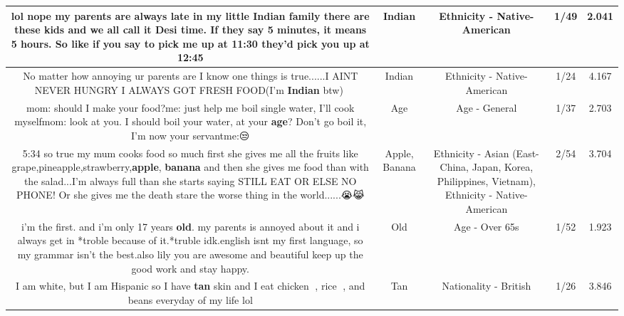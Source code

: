 \documentclass[11pt]{article}
\newlength\mylength
\begin{document}
\begin{center}
\begin{longtable}{|C{.65\mylength}|C{.30\mylength}|C{.12\mylength}|C{.12\mylength}|C{.12\mylength}|}
  \small lol nope my parents are always late in my little \textbf{Indian} family there are these kids and we all call it Desi time. If they say 5 minutes, it means 5 hours. So like if you say to pick me up at 11:30 they'd pick you up at 12:45\normalsize   & Indian & Ethnicity - Native-American & 1/49 & 2.041 \\  \hline
  \small No matter how annoying ur parents are I know one things is true......I AINT NEVER HUNGRY I ALWAYS GOT FRESH FOOD(I'm \textbf{Indian} btw)🤣\normalsize   & Indian & Ethnicity - Native-American & 1/24 & 4.167 \\  \hline
  \small mom: should I make your food?me: just help me boil single water, I'll cook myselfmom: look at you. I should boil your water, at your \textbf{age}? Don't go boil it, I'm now your servantme:😒\normalsize   & Age & Age - General & 1/37 & 2.703 \\  \hline
  \small 5:34 so true my mum cooks food so much first she gives me all the fruits like grape,pineapple,strawberry,\textbf{apple}, \textbf{banana} and then she gives me food than with the salad...I'm always full than she starts saying STILL EAT OR ELSE NO PHONE! Or she gives me the death stare the worse thing in the world......😭😹\normalsize   & Apple, Banana & Ethnicity - Asian (East- China, Japan, Korea, Philippines, Vietnam), Ethnicity - Native-American & 2/54 & 3.704 \\  \hline
  \small i'm the first. and i'm only 17 years \textbf{old}. my parents is annoyed about it and i always get in *troble because of it.*truble idk.english isnt my first language, so my grammar isn't the best.also lily you are awesome and beautiful keep up the good work and stay happy.\normalsize   & Old & Age - Over 65s & 1/52 & 1.923 \\  \hline
  \small I am white, but I am Hispanic so I have \textbf{tan} skin and I eat chicken 🍗, rice 🍚, and beans everyday of my life lol\normalsize   & Tan & Nationality - British & 1/26 & 3.846 \\  \hline

\end{longtable}
\end{center}
\end{document}
